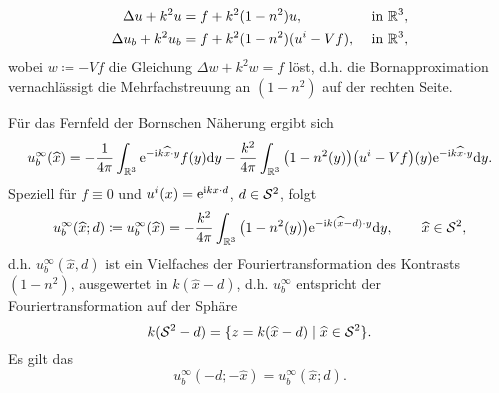\begin{bem}
	\begin{align*}
		\Delta u+k^2u&=f+k^2(1-n^2)u,\quad&\text{ in }\mathbb{R}^3,\\
		\Delta u_b+k^2u_b&=f+k^2(1-n^2)(u^i-Vf),&\text{ in }\mathbb{R}^3,
	\end{align*}
	wobei \(w\coloneqq-Vf\) die Gleichung \(\Delta w+k^2w=f\) löst, d.h. die Bornapproximation vernachlässigt die Mehrfachstreuung an \((1-n^2)\) auf der rechten Seite.
	
	Für das Fernfeld der Bornschen Näherung ergibt sich
	\begin{equation}
		\label{fernfeld bornsche näherung}
		u_b^\infty(\widehat{x})=-\frac{1}{4\pi}\int_{\mathbb{R}^3}\mathrm{e}^{-\mathrm{i} k\widehat{x}\cdot y}f(y)\mathrm{d}y-\frac{k^2}{4\pi}\int_{\mathbb{R}^3}\big(1-n^2(y)\big)\big(u^i-Vf\big)(y)\mathrm{e}^{-\mathrm{i} k\widehat{x}\cdot y}\mathrm{d}y.
	\end{equation}
	Speziell für \(f\equiv0\) und \(u^i(x)=\mathrm{e}^{\mathrm{i} kx\cdot d}\), \(d\in\mathcal{S}^2\), folgt
	\begin{equation*}
		u_b^\infty(\widehat{x};d)\coloneqq u_b^\infty(\widehat{x})=-\frac{k^2}{4\pi}\int_{\mathbb{R}^3}\big(1-n^2(y)\big)\mathrm{e}^{-\mathrm{i} k(\widehat{x}-d)\cdot y}\mathrm{d}y,\qquad\widehat{x}\in\mathcal{S}^2,
	\end{equation*}
	d.h. \(u_b^\infty(\widehat{x},d)\) ist ein Vielfaches der Fouriertransformation des Kontrasts \((1-n^2)\), ausgewertet in \(k(\widehat{x}-d)\), d.h. \(u_b^\infty\) entspricht der Fouriertransformation auf der Sphäre
	\begin{equation*}
		k(\mathcal{S}^2-d)=\{z=k(\widehat{x}-d)\mid\widehat{x}\in\mathcal{S}^2\}.
	\end{equation*}
	Es gilt das 
	\begin{equation}
		u_b^\infty(-d;-\widehat{x})=u_b^\infty(\widehat{x};d).
	\end{equation}
\end{bem}





























